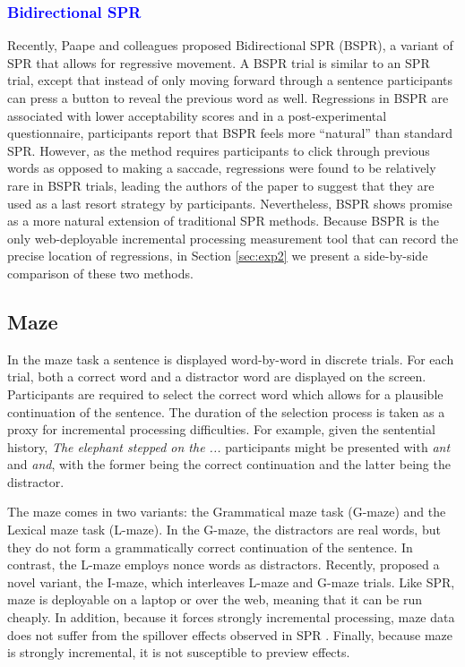 \documentclass[12pt]{article}
\newcommand{\word}[1]{\textit{#1}}
\newcommand{\change}[1]{\textcolor{blue}{#1}}
\begin{document}
\subsubsection{\change{Bidirectional SPR}}


Recently, Paape and colleagues \citep{paape2021nothing, paape2022reanalysis} proposed Bidirectional SPR (BSPR), a variant of SPR that allows for regressive movement. A BSPR trial is similar to an SPR trial, except that instead of only moving forward through a sentence participants can press a button to reveal the previous word as well. Regressions in BSPR are associated with lower acceptability scores \citep{paape2021nothing} and in a post-experimental questionnaire, participants report that BSPR feels more ``natural'' than standard SPR. However, as the method requires participants to click through previous words as opposed to making a saccade, regressions were found to be relatively rare in BSPR trials, leading the authors of the paper to suggest that they are used as a last resort strategy by participants. Nevertheless, BSPR shows promise as a more natural extension of traditional SPR methods. Because BSPR is the only web-deployable incremental processing measurement tool that can record the precise location of regressions, in Section \ref{sec:exp2} we present a side-by-side comparison of these two methods.


\subsection{Maze}

In the maze task \citep{forster2009maze} a sentence is displayed word-by-word in discrete trials. For each trial, both a correct word and a distractor word are displayed on the screen. Participants are required to select the correct word which allows for a plausible continuation of the sentence. The duration of the selection process is taken as a proxy for incremental processing difficulties. For example, given the sentential history, \word{The elephant stepped on the ...}  participants might be presented with \word{ant} and \word{and}, with the former being the correct continuation and the latter being the distractor.

The maze comes in two variants: the Grammatical maze task (G-maze) and the Lexical maze task (L-maze). In the G-maze, the distractors are real words, but they do not form a grammatically correct continuation of the sentence. In contrast, the L-maze employs nonce words as distractors. Recently, \cite{vani2021} proposed a novel variant, the I-maze, which interleaves L-maze and G-maze trials. Like SPR, maze is deployable on a laptop or over the web, meaning that it can be run cheaply. In addition, because it forces strongly incremental processing, maze data does not suffer from the spillover effects observed in SPR \citep{witzel2012maze, boyce2020amaze, boyce2020stories}. Finally, because maze is strongly incremental, it is not susceptible to preview effects.
\end{document}
